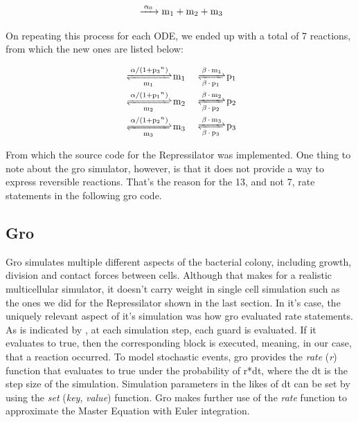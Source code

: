 \documentclass[12pt]{article}
\begin{document}
    \begin{equation}
    \ce{ ->[\alpha_{0}] m_{1} + m_{2} + m_{3}}
    \end{equation}
    
    On repeating this process for each ODE, we ended up with a total of 7 reactions, from which the new ones are listed below:
    
    \begin{equation}
    \begin{aligned}[c]
        \ce{ <=>[\alpha/(1 + p_{3}^n)][m_{1}] m_{1}} & & \\
        \ce{ <=>[\alpha/(1 + p_{1}^n)][m_{2}] m_{2}} & & \\
        \ce{ <=>[\alpha/(1 + p_{2}^n)][m_{3}] m_{3}} & &
    \end{aligned}
    \begin{aligned}[c]
        \ce{ <=>[\beta*m_{1}][\beta*p_{1}] p_{1}} \\
        \ce{ <=>[\beta*m_{2}][\beta*p_{2}] p_{2}} \\
        \ce{ <=>[\beta*m_{3}][\beta*p_{3}] p_{3}}
    \end{aligned}
    \end{equation}
    
    From which the source code for the Repressilator was implemented. One thing to note about the gro simulator, however, is that it does not provide a way to express reversible reactions. That's the reason for the 13, and not 7, rate statements in the following gro code.
    
    

\subsection{Gro}
    
    Gro simulates multiple different aspects of the bacterial colony, including growth, division and contact forces between cells. Although that makes for a realistic multicellular simulator, it doesn't carry weight in single cell simulation such as the ones we did for the Repressilator shown in the last section. In it's case, the uniquely relevant aspect of it's simulation was how gro evaluated rate statements. As is indicated by \cite{Hoops2006}, at each simulation step, each guard is evaluated. If it evaluates to true, then the corresponding block is executed, meaning, in our case, that a reaction occurred. To model stochastic events, gro provides the \textit{rate} (\textit{r}) function that evaluates to true under the probability of r*dt, where the dt is the step size of the simulation. Simulation parameters in the likes of dt can be set by using the \textit{set} (\textit{key}, \textit{value}) function. Gro makes further use of the \textit{rate} function to approximate the Master Equation with Euler integration. 
    
\end{document}

